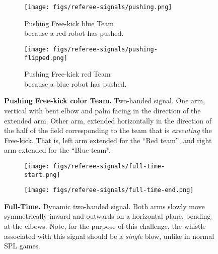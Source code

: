 \begin{figure}[ht!]
    \centering
    \begin{subfigure}{.33\textwidth}
        \centering
        \texttt{[image: figs/referee-signals/pushing.png]}
        \caption{{\color{blue}Pushing Free-kick \textlangle{}blue\textrangle{} Team}\\ because a {\color{red}red} robot has pushed.}
    \end{subfigure}
    \begin{subfigure}{.33\textwidth}
        \centering
        \texttt{[image: figs/referee-signals/pushing-flipped.png]}
        \caption{{\color{red}Pushing Free-kick \textlangle{}red\textrangle{} Team}\\ because a {\color{blue}blue} robot has pushed.}
    \end{subfigure}
    \caption{\textbf{Pushing Free-kick \textlangle{}color\textrangle{} Team.} Two-handed signal. One arm, vertical with bent elbow and palm facing in the direction of the extended arm. Other arm, extended horizontally in the direction of the half of the field corresponding to the team that is \emph{executing} the Free-kick. That is, left arm extended for the ``Red team'', and right arm extended for the ``Blue team''.}
\end{figure}

\begin{figure}[ht!]
    \centering
    \begin{subfigure}{.33\textwidth}
        \centering
        \texttt{[image: figs/referee-signals/full-time-start.png]}
    \end{subfigure}
    \begin{subfigure}{.33\textwidth}
        \centering
        \texttt{[image: figs/referee-signals/full-time-end.png]}
    \end{subfigure}
    \caption{\textbf{Full-Time.} Dynamic two-handed signal. Both arms slowly move symmetrically inward and outwards on a horizontal plane, bending at the elbows. Note, for the purpose of this challenge, the whistle associated with this signal should be a \textit{single} blow, unlike in normal SPL games.}
\end{figure}

\clearpage
